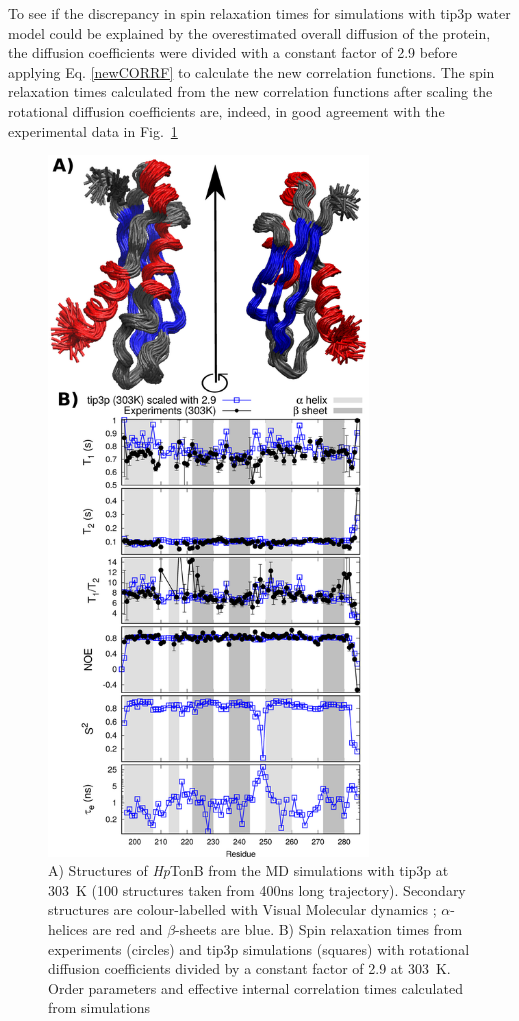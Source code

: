 \documentclass[pre,aps,floatfix,authordate1-4,twocolumn]{revtex4-1}
\begin{document}
To see if the discrepancy in spin relaxation times for simulations with tip3p water model
could be explained by the overestimated overall diffusion of the protein,
the diffusion coefficients were divided with a constant factor of 2.9 before applying
Eq. \ref{newCORRF} to calculate the new correlation functions. The spin
relaxation times calculated from the new correlation functions after scaling
the rotational diffusion coefficients are, indeed, in good agreement with
the experimental data in Fig.~\ref{HpTonBrelaxationDATAscaled}
\begin{figure}[!h]
  \includegraphics[width=8.5cm]{../Figs/RELdataHpTonB2.eps}%
  \caption{A) Structures of {\it Hp}TonB from the MD simulations with tip3p at 303~K
    (100 structures taken from 400ns long trajectory). Secondary structures
    are colour-labelled with Visual Molecular dynamics \cite{frishman95,humphrey96};
    $\alpha$-helices are red and $\beta$-sheets are blue.
    B) Spin relaxation times from experiments (circles) and tip3p
    simulations (squares) with rotational diffusion coefficients divided by a
    constant factor of 2.9 at 303~K. Order parameters and effective internal correlation
    times calculated from simulations
    \label{HpTonBrelaxationDATAscaled}}%
\end{figure}
\end{document}
